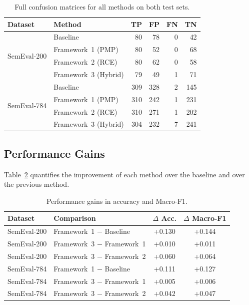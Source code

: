 \documentclass{article}
\begin{document}
\begin{table}[h]
\centering
\small
\caption{Full confusion matrices for all methods on both test sets.}
\label{tab:confusion-full}
\begin{tabular}{llrrrr}
\toprule
Dataset & Method & TP & FP & FN & TN \\
\midrule
\multirow{4}{*}{SemEval-200}
    & Baseline            & 80 & 78 &  0 & 42 \\
    & Framework~1 (PMP)   & 80 & 52 &  0 & 68 \\
    & Framework~2 (RCE)   & 80 & 62 &  0 & 58 \\
    & Framework~3 (Hybrid)& 79 & 49 &  1 & 71 \\
\midrule
\multirow{4}{*}{SemEval-784}
    & Baseline            & 309 & 328 &  2 & 145 \\
    & Framework~1 (PMP)   & 310 & 242 &  1 & 231 \\
    & Framework~2 (RCE)   & 310 & 271 &  1 & 202 \\
    & Framework~3 (Hybrid)& 304 & 232 &  7 & 241 \\
\bottomrule
\end{tabular}
\end{table}

\subsection{Performance Gains}

Table~\ref{tab:gains} quantifies the improvement of each method over the baseline and over the previous method.

\begin{table}[h]
\centering
\small
\caption{Performance gains in accuracy and Macro-F1.}
\label{tab:gains}
\begin{tabular}{llcc}
\toprule
Dataset & Comparison & $\Delta$ Acc. & $\Delta$ Macro-F1 \\
\midrule
SemEval-200 & Framework~1 $-$ Baseline    & +0.130 & +0.144 \\
SemEval-200 & Framework~3 $-$ Framework~1 & +0.010 & +0.011 \\
SemEval-200 & Framework~3 $-$ Framework~2 & +0.060 & +0.064 \\
\midrule
SemEval-784 & Framework~1 $-$ Baseline    & +0.111 & +0.127 \\
SemEval-784 & Framework~3 $-$ Framework~1 & +0.005 & +0.006 \\
SemEval-784 & Framework~3 $-$ Framework~2 & +0.042 & +0.047 \\
\bottomrule
\end{tabular}
\end{table}
\end{document}
